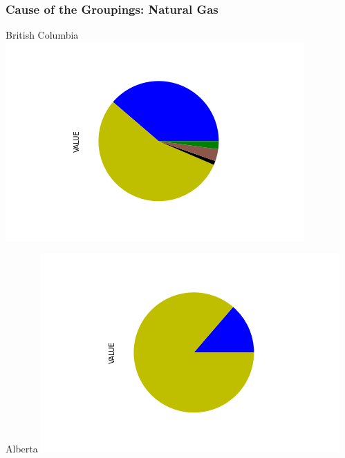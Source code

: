 \documentclass{beamer}
\begin{document}
\begin{frame}
\frametitle{Cause of the Groupings: Natural Gas}


\begin{minipage}[b]{0.2\textwidth}
\begin{center}
\tiny{British Columbia}
\includegraphics[width=\textwidth, trim={120pt 50pt 110pt 50pt}, clip]{../British_Columbia.png}%
\end{center}
\end{minipage}%
%
\begin{minipage}[b]{0.2\textwidth}
\begin{center}
\tiny{Alberta}
\includegraphics[width=\textwidth, trim={120pt 50pt 110pt 50pt}, clip]{../Alberta.png}%
\end{center}
\end{minipage}%
%
\begin{minipage}[b]{0.2\textwidth}

\end{minipage}
\end{frame}
\end{document}
